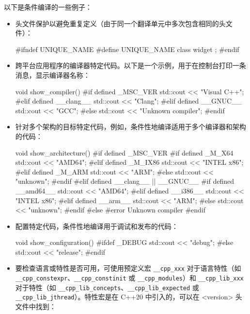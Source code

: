 以下是条件编译的一些例子：

\begin{itemize}
\item
头文件保护以避免重复定义（由于同一个翻译单元中多次包含相同的头文件）：

\begin{cpp}
#ifndef UNIQUE_NAME
#define UNIQUE_NAME
class widget { };
#endif
\end{cpp}

\item
跨平台应用程序的编译器特定代码。以下是一个示例，用于在控制台打印一条消息，显示编译器名称：

\begin{cpp}
void show_compiler()
{
#if defined _MSC_VER
    std::cout << "Visual C++\n";
#elif defined __clang__
    std::cout << "Clang\n";
#elif defined __GNUC__
    std::cout << "GCC\n";
#else
    std::cout << "Unknown compiler\n";
#endif
}
\end{cpp}

\item
针对多个架构的目标特定代码，例如，条件性地编译适用于多个编译器和架构的代码：

\begin{cpp}
void show_architecture()
{
#if defined _MSC_VER
#if defined _M_X64
    std::cout << "AMD64\n";
#elif defined _M_IX86
    std::cout << "INTEL x86\n";
#elif defined _M_ARM
    std::cout << "ARM\n";
#else
    std::cout << "unknown\n";
#endif
#elif defined __clang__ || __GNUC__
#if defined __amd64__
    std::cout << "AMD64\n";
#elif defined __i386__
    std::cout << "INTEL x86\n";
#elif defined __arm__
    std::cout << "ARM\n";
#else
    std::cout << "unknown\n";
#endif
#else
#error Unknown compiler
#endif
}
\end{cpp}

\item
配置特定代码，条件性地编译用于调试和发布的代码：

\begin{cpp}
void show_configuration()
{
#ifdef _DEBUG
    std::cout << "debug\n";
#else
    std::cout << "release\n";
#endif
}
\end{cpp}

\item
要检查语言或特性是否可用，可使用预定义宏 \verb|__cpp_xxx| 对于语言特性（如 \verb|__cpp_constexpr|、\verb|__cpp_constinit| 或 \verb|__cpp_modules|）和 \verb|__cpp_lib_xxx| 对于特性（如 \verb|__cpp_lib_concepts|、\verb|__cpp_lib_expected| 或 \verb|__cpp_lib_jthread|）。特性宏是在 C++20 中引入的，可以在 <version> 头文件中找到：


\end{itemize}
